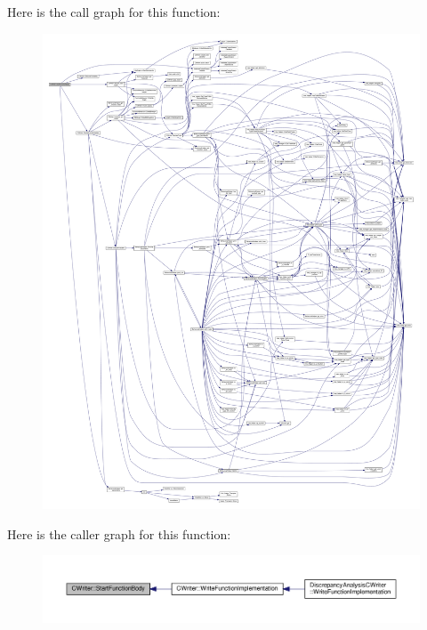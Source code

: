 Here is the call graph for this function\+:
\nopagebreak
\begin{figure}[H]
\begin{center}
\leavevmode
\includegraphics[width=350pt]{d3/d59/classCWriter_a10dc0cac6629dd939842250345feb477_cgraph}
\end{center}
\end{figure}
Here is the caller graph for this function\+:
\nopagebreak
\begin{figure}[H]
\begin{center}
\leavevmode
\includegraphics[width=350pt]{d3/d59/classCWriter_a10dc0cac6629dd939842250345feb477_icgraph}
\end{center}
\end{figure}
\mbox{\label{classCWriter_a60ced6c07b4f41a09acdae409615e24e}} 
